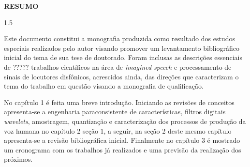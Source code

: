 \documentclass[a4paper,12pt,openright,oneside]{book}
\newenvironment{myenv}[1]
  {\begin{spacing}{#1}}
  {\end{spacing}}
\begin{document}

	\setlength{\parindent}{0pt}
	\newpage \thispagestyle{empty}
	\vspace{1.5cm}
	\fontsize{12}{\baselineskip} \selectfont

	\begin{center}
		{\huge{\textbf{RESUMO}}}
	\end{center}

	\begin{myenv}{1.5}
		\fontsize{12}{\baselineskip} \selectfont \onehalfspacing
		\par \null
		\par \null
		\par Este documento constitui a monografia produzida como resultado dos estudos especiais realizados pelo autor visando promover um levantamento bibliográfico inicial do tema de sua tese de doutorado. Foram inclusas as descrições essenciais de ????? trabalhos científicos na área de \textit{imagined speech} e processamento de sinais de locutores disfônicos, acrescidos ainda, das direções que caracterizam o tema do trabalho em questão visando a monografia de qualificação.
		
		\par No capítulo 1 é feita uma breve introdução. Iniciando as revisões de conceitos apresenta-se a engenharia paraconsistente de características, filtros digitais \textit{wavelets}, amostragem, quantização e caracterização dos processos de produção da voz humana no capítulo 2 seção 1, a seguir, na seção 2 deste mesmo capítulo apresenta-se a revisão bibliográfica inicial. Finalmente no capítulo 3 é mostrado um cronograma com os trabalhos já realizados e uma previsão da realização dos próximos.
		
	\end{myenv}

	\cleardoublepage
	\listoffigures
	
	\cleardoublepage
	\listoftables
	\frontmatter
	
	\def\contentsname{Sumário} 
	\tableofcontents
	\cleardoublepage
	
	\mainmatter
	\setlength{\parindent}{1.25cm}
\end{document}
